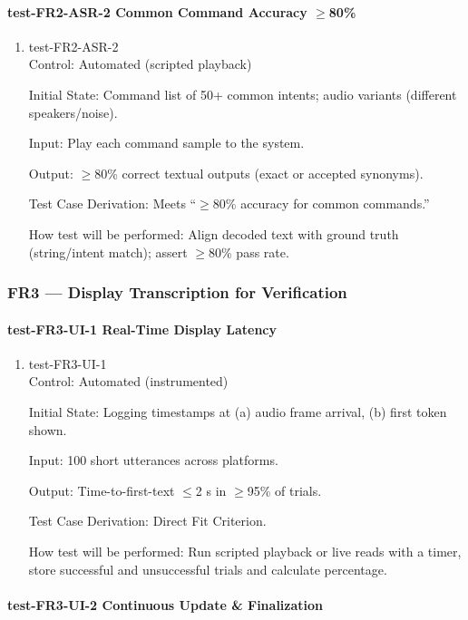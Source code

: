 \documentclass[12pt, titlepage]{article}
\begin{document}
\paragraph{test-FR2-ASR-2 Common Command Accuracy $\geq$80\%}

\begin{enumerate}
\item{test-FR2-ASR-2\\}
Control: Automated (scripted playback)

Initial State: Command list of 50+ common intents; audio variants (different speakers/noise).

Input: Play each command sample to the system.

Output: $\geq$80\% correct textual outputs (exact or accepted synonyms).

Test Case Derivation: Meets “$\geq$80\% accuracy for common commands.”

How test will be performed: Align decoded text with ground truth (string/intent match); assert $\geq$80\% pass rate.
\end{enumerate}

\subsubsection{FR3 — Display Transcription for Verification}

\paragraph{test-FR3-UI-1 Real-Time Display Latency}

\begin{enumerate}
\item{test-FR3-UI-1\\}
Control: Automated (instrumented)

Initial State: Logging timestamps at (a) audio frame arrival, (b) first token shown.

Input: 100 short utterances across platforms.

Output: Time-to-first-text $\leq$2 s in $\geq$95\% of trials.

Test Case Derivation: Direct Fit Criterion.

How test will be performed: Run scripted playback or live reads with a timer, store successful and unsuccessful trials and calculate percentage.
\end{enumerate}

\paragraph{test-FR3-UI-2 Continuous Update \& Finalization}
\end{document}
